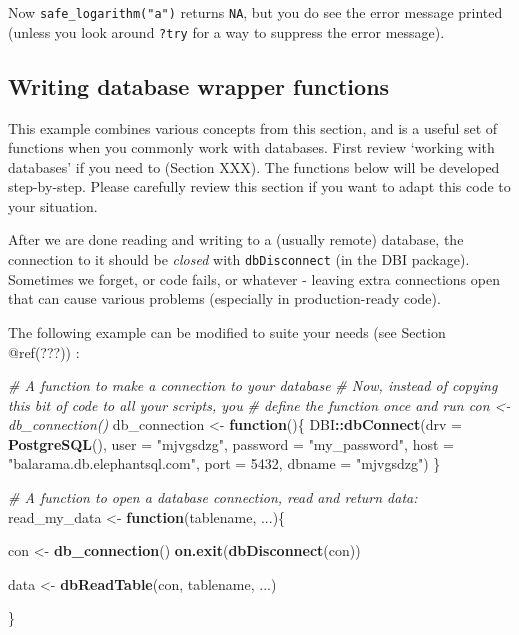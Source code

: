 \documentclass[]{book}
\newenvironment{Shaded}{\begin{snugshade}}{\end{snugshade}}
\newcommand{\CommentTok}[1]{\textcolor[rgb]{0.56,0.35,0.01}{\textit{#1}}}
\newcommand{\ControlFlowTok}[1]{\textcolor[rgb]{0.13,0.29,0.53}{\textbf{#1}}}
\newcommand{\DataTypeTok}[1]{\textcolor[rgb]{0.13,0.29,0.53}{#1}}
\newcommand{\DecValTok}[1]{\textcolor[rgb]{0.00,0.00,0.81}{#1}}
\newcommand{\KeywordTok}[1]{\textcolor[rgb]{0.13,0.29,0.53}{\textbf{#1}}}
\newcommand{\NormalTok}[1]{#1}
\newcommand{\OperatorTok}[1]{\textcolor[rgb]{0.81,0.36,0.00}{\textbf{#1}}}
\newcommand{\StringTok}[1]{\textcolor[rgb]{0.31,0.60,0.02}{#1}}
\begin{document}
Now \texttt{safe\_logarithm("a")} returns \texttt{NA}, but you do see the error message printed (unless you look around \texttt{?try} for a way to suppress the error message).

\hypertarget{writing-database-wrapper-functions}{%
\subsection{Writing database wrapper functions}\label{writing-database-wrapper-functions}}

This example combines various concepts from this section, and is a useful set of functions when you commonly work with databases. First review `working with databases' if you need to (Section XXX). The functions below will be developed step-by-step. Please carefully review this section if you want to adapt this code to your situation.

After we are done reading and writing to a (usually remote) database, the connection to it should be \emph{closed} with \texttt{dbDisconnect} (in the DBI package). Sometimes we forget, or code fails, or whatever - leaving extra connections open that can cause various problems (especially in production-ready code).

The following example can be modified to suite your needs (see Section @ref(???)) :

\begin{Shaded}
\begin{Highlighting}[]
\CommentTok{# A function to make a connection to your database}
\CommentTok{# Now, instead of copying this bit of code to all your scripts, you}
\CommentTok{# define the function once and run con <- db_connection()}
\NormalTok{db_connection <-}\StringTok{ }\ControlFlowTok{function}\NormalTok{()\{}
\NormalTok{  DBI}\OperatorTok{::}\KeywordTok{dbConnect}\NormalTok{(}\DataTypeTok{drv =} \KeywordTok{PostgreSQL}\NormalTok{(),}
                 \DataTypeTok{user =} \StringTok{"mjvgsdzg"}\NormalTok{,}
                 \DataTypeTok{password =} \StringTok{"my_password"}\NormalTok{,}
                 \DataTypeTok{host =} \StringTok{"balarama.db.elephantsql.com"}\NormalTok{,}
                 \DataTypeTok{port =} \DecValTok{5432}\NormalTok{,}
                 \DataTypeTok{dbname =} \StringTok{"mjvgsdzg"}\NormalTok{)}
\NormalTok{\}}


\CommentTok{# A function to open a database connection, read and return data:}
\NormalTok{read_my_data <-}\StringTok{ }\ControlFlowTok{function}\NormalTok{(tablename, ...)\{}
  
\NormalTok{  con <-}\StringTok{ }\KeywordTok{db_connection}\NormalTok{()}
  \KeywordTok{on.exit}\NormalTok{(}\KeywordTok{dbDisconnect}\NormalTok{(con))}
  
\NormalTok{  data <-}\StringTok{ }\KeywordTok{dbReadTable}\NormalTok{(con, tablename, ...)}
  
\NormalTok{\}}
\end{Highlighting}
\end{Shaded}
\end{document}
